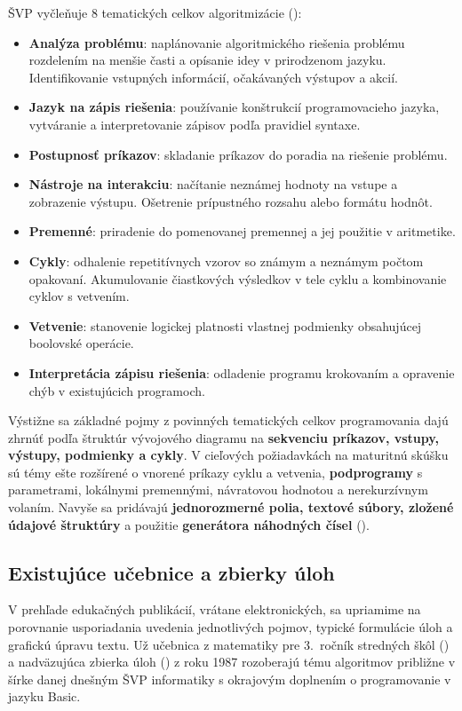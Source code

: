 ŠVP vyčleňuje 8 tematických celkov algoritmizácie (\cite{statny_2023}):
\begin{itemize}[noitemsep,topsep=0pt]
\item \textbf{Analýza problému}: naplánovanie algoritmického riešenia problému rozdelením na menšie časti a opísanie idey v prirodzenom jazyku. Identifikovanie vstupných informácií, očakávaných výstupov a akcií.
\item \textbf{Jazyk na zápis riešenia}: používanie konštrukcií programovacieho jazyka, vytváranie a interpretovanie zápisov podľa pravidiel syntaxe.
\item \textbf{Postupnosť príkazov}: skladanie príkazov do poradia na riešenie problému.
\item \textbf{Nástroje na interakciu}: načítanie neznámej hodnoty na vstupe a zobrazenie výstupu. Ošetrenie prípustného rozsahu alebo formátu hodnôt.
\item \textbf{Premenné}: priradenie do pomenovanej premennej a jej použitie v aritmetike.
\item \textbf{Cykly}: odhalenie repetitívnych vzorov so známym a neznámym počtom opakovaní. Akumulovanie čiastkových výsledkov v tele cyklu a kombinovanie cyklov s vetvením.
\item \textbf{Vetvenie}: stanovenie logickej platnosti vlastnej podmienky obsahujúcej boolovské operácie.
\item \textbf{Interpretácia zápisu riešenia}: odladenie programu krokovaním a opravenie chýb v existujúcich programoch.
\end{itemize}

Výstižne sa základné pojmy z povinných tematických celkov programovania dajú zhrnúť podľa štruktúr vývojového diagramu na \textbf{sekvenciu príkazov, vstupy, výstupy, podmienky a cykly}. V cieľových požiadavkách na maturitnú skúšku sú témy ešte rozšírené o vnorené príkazy cyklu a vetvenia, \textbf{podprogramy} s parametrami, lokálnymi premennými, návratovou hodnotou a nerekurzívnym volaním. Navyše sa pridávajú \textbf{jednorozmerné polia, textové súbory, zložené údajové štruktúry} a použitie \textbf{generátora náhodných čísel} (\cite{cp_2023}).

\subsection{Existujúce učebnice a zbierky úloh}
V prehľade edukačných publikácií, vrátane elektronických, sa upriamime na porovnanie usporiadania uvedenia jednotlivých pojmov, typické formulácie úloh a grafickú úpravu textu. Už učebnica z matematiky pre 3.~ročník stredných škôl (\cite{sedivy_matematika_1986}) a nadväzujúca zbierka úloh (\cite{busek_zbierka_1987}) z roku 1987 rozoberajú tému algoritmov približne v šírke danej dnešným ŠVP informatiky s okrajovým doplnením o programovanie v jazyku Basic.

